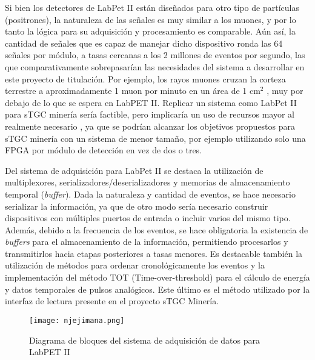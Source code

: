 	Si bien los detectores de LabPet II están diseñados para otro tipo de partículas (positrones), la naturaleza de las señales es muy similar a los muones, y por lo tanto la lógica para su adquisición y procesamiento es comparable. Aún así, la cantidad de señales que es capaz de manejar dicho dispositivo ronda las 64 señales por módulo, a tasas cercanas a los 2 millones de eventos por segundo, las que comparativamente sobrepasarían las necesidades del sistema a desarrollar en este proyecto de titulación. Por ejemplo, los rayos muones cruzan la corteza terrestre a aproximadamente 1 muon por minuto en un área de 1 cm$^2$\cite{Rocca2018CosmicUs} , muy por debajo de lo que se espera en LabPET II. Replicar un sistema como LabPet II para sTGC minería sería factible, pero implicaría un uso de recursos mayor al realmente necesario , ya que se podrían alcanzar los objetivos propuestos para sTGC minería con un sistema de menor tamaño, por ejemplo utilizando solo una FPGA por módulo de detección en vez de dos o tres.
	
	Del sistema de adquisición para LabPet II se destaca la utilización de multiplexores, serializadores/deserializadores y memorias de almacenamiento temporal (\textit{buffer}). Dada la naturaleza y cantidad de eventos, se hace necesario serializar la información, ya que de otro modo sería necesario construir dispositivos con múltiples puertos de entrada o incluir varios del mismo tipo. Además, debido a la frecuencia de los eventos, se hace obligatoria la existencia de \textit{buffers} para el almacenamiento de la información, permitiendo procesarlos y transmitirlos hacia etapas posteriores a tasas menores. Es destacable también la utilización de métodos para ordenar cronológicamente los eventos y la implementación del método TOT (Time-over-threshold)\cite{Orita2018TheSystem} para el cálculo de energía y datos temporales de pulsos analógicos. Este último es el método utilizado por la interfaz de lectura presente en el proyecto sTGC Minería.
	
	\begin{figure}[h]
		\centering
		\texttt{[image: njejimana.png]}
		\caption{Diagrama de bloques del sistema de adquisición de datos para LabPET II \cite{Njejimana2013DesignImaging}}
		\label{fig:njejimana}
	\end{figure}
	
